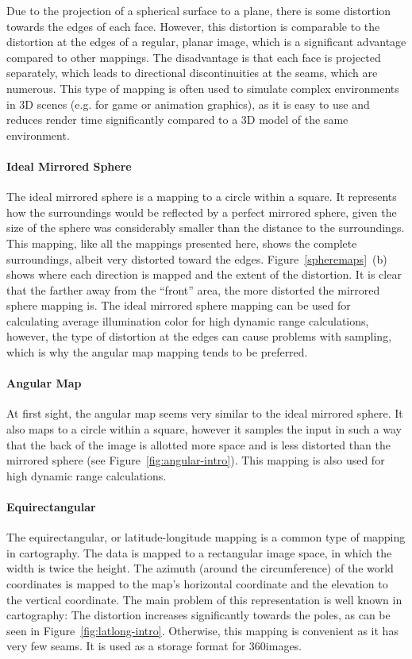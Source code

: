 Due to the projection of a spherical surface to a plane, there is some distortion towards the edges of each face. However, this distortion is comparable to the distortion at the edges of a regular, planar image, which is a significant advantage compared to other mappings. The disadvantage is that each face is projected separately, which leads to directional discontinuities at the seams, which are numerous. This type of mapping is often used to simulate complex environments in 3D scenes (e.g. for game or animation graphics), as it is easy to use and reduces render time significantly compared to a 3D model of the same environment.
\cite{hdrbook}

\paragraph{Ideal Mirrored Sphere}
The ideal mirrored sphere is a mapping to a circle within a square. It represents how the surroundings would be reflected by a perfect mirrored sphere, given the size of the sphere was considerably smaller than the distance to the surroundings. This mapping, like all the mappings presented here, shows the complete surroundings, albeit very distorted toward the edges. Figure~\ref{spheremaps}~(b) shows where each direction is mapped and the extent of the distortion. It is clear that the farther away from the ``front'' area, the more distorted the mirrored sphere mapping is. The ideal mirrored sphere mapping can be used for calculating average illumination color for high dynamic range calculations, however, the type of distortion at the edges can cause problems with sampling, which is why the angular map mapping tends to be preferred.
\cite{hdrbook}

\paragraph{Angular Map}
At first sight, the angular map seems very similar to the ideal mirrored sphere. It also maps to a circle within a square, however it samples the input in such a way that the back of the image is allotted more space and is less distorted than the mirrored sphere (see Figure~\ref{fig:angular-intro}). This mapping is also used for high dynamic range calculations.

\paragraph{Equirectangular}
The equirectangular, or latitude-longitude mapping is a common type of mapping in cartography. The data is mapped to a rectangular image space, in which the width is twice the height. The azimuth (around the circumference) of the world coordinates is mapped to the map's horizontal coordinate and the elevation to the vertical coordinate. The main problem of this representation is well known in cartography: The distortion increases significantly towards the poles, as can be seen in Figure~\ref{fig:latlong-intro}. Otherwise, this mapping is convenient as it has very few seams. It is used as a storage format for 360\degree images.

